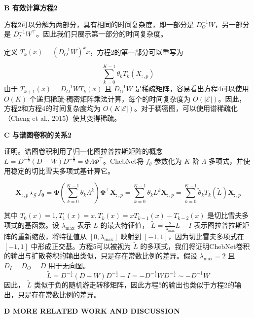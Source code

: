 \documentclass[10.5pt,compsoc,UTF8]{CjC}
\theoremstyle{mystyle}
\begin{document}
\textbf{B 有效计算方程2}


方程2可以分解为两部分，具有相同的时间复杂度，即一部分是 \(D_{O}^{-1} W\)，另一部分是 \(D_{I}^{-1} W^{\top}\)。因此我们只展示第一部分的时间复杂度。

定义 \(T_{k}(x)=\left(D_{O}^{-1} W\right)^{k} x\)，方程2的第一部分可以重写为

\begin{equation}
\sum_{k=0}^{K-1} \theta_{k} T_{k}\left(X_{:, p}\right)
\end{equation}
由于 \(T_{k+1}(x)=D_{O}^{-1} W T_{k}(x)\) 且 \(D_{O}^{-1} W\) 是稀疏矩阵，容易看出方程4可以使用 \(O(K)\) 个递归稀疏-稠密矩阵乘法计算，每个的时间复杂度为 \(O(|\mathcal{E}|)\)。因此，方程2和方程4的时间复杂度均为 \(O(K|\mathcal{E}|)\)。对于稠密图，可以使用谱稀疏化（Cheng et al., 2015）使其变得稀疏。

\textbf{C 与谱图卷积的关系2}

证明。谱图卷积利用了归一化图拉普拉斯矩阵的概念 \(L= D^{-\frac{1}{2}}(D-W) D^{-\frac{1}{2}}=\Phi \Lambda \Phi^{\top}\)。ChebNet将 \(f_{\theta}\) 参数化为 \(K\) 阶 \(\Lambda\) 多项式，并使用稳定的切比雪夫多项式基计算它。

\begin{equation}
\boldsymbol{X}_{:, p} \star_{\mathcal{G}} f_{\boldsymbol{\theta}}=\boldsymbol{\Phi}\left(\sum_{k=0}^{K-1} \theta_{k} \Lambda^{k}\right) \boldsymbol{\Phi}^{\top} \boldsymbol{X}_{:, p}=\sum_{k=0}^{K-1} \theta_{k} L^{k} \boldsymbol{X}_{:, p}=\sum_{k=0}^{K-1} \tilde{\theta}_{k} T_{k}(\tilde{L}) \boldsymbol{X}_{:, p}
\end{equation}

其中 \(T_{0}(x)=1, T_{1}(x)=x, T_{k}(x)=x T_{k-1}(x)-T_{k-2}(x)\) 是切比雪夫多项式的基函数。设 \(\lambda_{\max }\) 表示 \(L\) 的最大特征值， \(\tilde{L}=\frac{2}{\lambda_{\max }} L-I\) 表示图拉普拉斯矩阵的重新缩放，将特征值从 \(\left[0, \lambda_{\max }\right]\) 映射到 \([-1,1]\)，因为切比雪夫多项式在 \([-1,1]\) 中形成正交基。方程5可以被视为 \(\tilde{L}\) 的多项式，我们将证明ChebNet卷积的输出与扩散卷积的输出类似，只是存在常数比例的差异。假设 \(\lambda_{\max }=2\) 且 \(D_{I}=D_{O}=D\) 用于无向图。
\begin{equation}
\tilde{L}=D^{-\frac{1}{2}}(D-W) D^{-\frac{1}{2}}-I=-D^{-\frac{1}{2}} W D^{-\frac{1}{2}} \sim-D^{-1} W
\end{equation}
因此， \(\tilde{L}\) 类似于负的随机游走转移矩阵，因此方程5的输出也类似于方程2的输出，只是存在常数比例的差异。

\textbf{D MORE RELATED WORK AND DISCUSSION}
\end{document}
